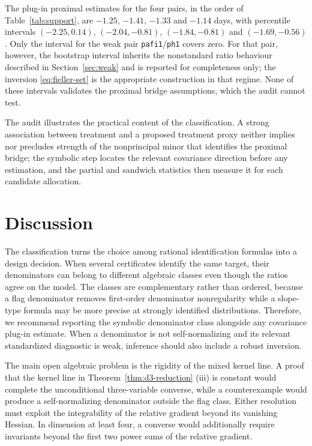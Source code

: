 \documentclass[12pt,a4paper]{article}
\theoremstyle{plain}
\theoremstyle{definition}
\begin{document}
The plug-in proximal estimates for the four pairs, in the order of Table~\ref{tab:support}, are $-1.25$, $-1.41$, $-1.33$ and $-1.14$ days, with percentile intervals $(-2.25, 0.14)$, $(-2.04, -0.81)$, $(-1.84, -0.81)$ and $(-1.69, -0.56)$.
Only the interval for the weak pair \texttt{pafi1}/\texttt{ph1} covers zero.
For that pair, however, the bootstrap interval inherits the nonstandard ratio behaviour described in Section~\ref{sec:weak} and is reported for completeness only;
the inversion \eqref{eq:fieller-set} is the appropriate construction in that regime.
None of these intervals validates the proximal bridge assumptions, which the audit cannot test.

The audit illustrates the practical content of the classification.
A strong association between treatment and a proposed treatment proxy neither implies nor precludes strength of the nonprincipal minor that identifies the proximal bridge;
the symbolic step locates the relevant covariance direction before any estimation, and the partial and sandwich statistics then measure it for each candidate allocation.

\section{Discussion}
\label{sec:discussion}
The classification turns the choice among rational identification formulas into a design decision.
When several certificates identify the same target, their denominators can belong to different algebraic classes even though the ratios agree on the model.
The classes are complementary rather than ordered, because a flag denominator removes first-order denominator nonregularity while a slope-type formula may be more precise at strongly identified distributions.
Therefore, we recommend reporting the symbolic denominator class alongside any covariance plug-in estimate.
When a denominator is not self-normalizing and its relevant standardized diagnostic is weak, inference should also include a robust inversion.

The main open algebraic problem is the rigidity of the mixed kernel line.
A proof that the kernel line in Theorem~\ref{thm:d3-reduction} (iii) is constant would complete the unconditional three-variable converse, while a counterexample would produce a self-normalizing denominator outside the flag class.
Either resolution must exploit the integrability of the relative gradient beyond its vanishing Hessian.
In dimension at least four, a converse would additionally require invariants beyond the first two power sums of the relative gradient.
\end{document}
